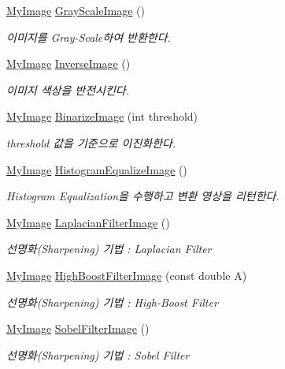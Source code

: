 \begin{DoxyCompactItemize}
\hyperlink{class_my_image}{My\-Image} \hyperlink{class_my_image_a0bd4058dece17b17c98fb0cf2786e61b}{Gray\-Scale\-Image} ()
\begin{DoxyCompactList}\small\item\em 이미지를 Gray-\/\-Scale하여 반환한다. \end{DoxyCompactList}\item 
\hyperlink{class_my_image}{My\-Image} \hyperlink{class_my_image_ab1b09108047771667e6eea6974a1ba44}{Inverse\-Image} ()
\begin{DoxyCompactList}\small\item\em 이미지 색상을 반전시킨다. \end{DoxyCompactList}\item 
\hyperlink{class_my_image}{My\-Image} \hyperlink{class_my_image_ac513076c52619abd251d0e756e256c9a}{Binarize\-Image} (int threshold)
\begin{DoxyCompactList}\small\item\em threshold 값을 기준으로 이진화한다. \end{DoxyCompactList}\item 
\hyperlink{class_my_image}{My\-Image} \hyperlink{class_my_image_adeb9f3c9a8e674d3170b13952d033329}{Histogram\-Equalize\-Image} ()
\begin{DoxyCompactList}\small\item\em Histogram Equalization을 수행하고 변환 영상을 리턴한다. \end{DoxyCompactList}\item 
\hyperlink{class_my_image}{My\-Image} \hyperlink{class_my_image_ac66955eba0161330746e7184c63b6a70}{Laplacian\-Filter\-Image} ()
\begin{DoxyCompactList}\small\item\em 선명화(\-Sharpening) 기법 \-: Laplacian Filter \end{DoxyCompactList}\item 
\hyperlink{class_my_image}{My\-Image} \hyperlink{class_my_image_af6c300627fcb08f1a1a54990c5abffd2}{High\-Boost\-Filter\-Image} (const double A)
\begin{DoxyCompactList}\small\item\em 선명화(\-Sharpening) 기법 \-: High-\/\-Boost Filter \end{DoxyCompactList}\item 
\hyperlink{class_my_image}{My\-Image} \hyperlink{class_my_image_aae9305b240652af26a79862f2b21f0e1}{Sobel\-Filter\-Image} ()
\begin{DoxyCompactList}\small\item\em 선명화(\-Sharpening) 기법 \-: Sobel Filter \end{DoxyCompactList}\item 

\end{DoxyCompactItemize}
